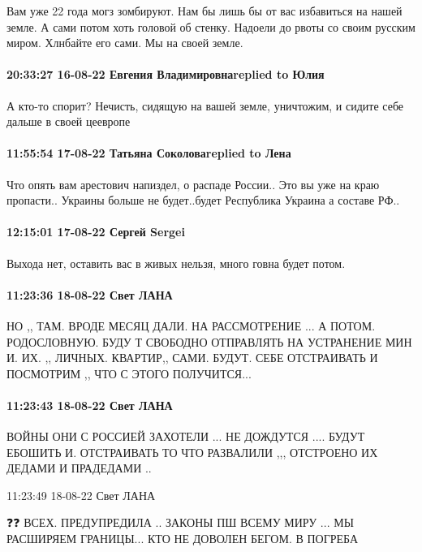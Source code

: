 Вам уже 22 года могз зомбируют. Нам бы лишь бы от вас избавиться на нашей
земле. А сами потом хоть головой об стенку. Надоели до рвоты со своим русским
миром. Хлнбайте его сами. Мы на своей земле.

\paragraph{20:33:27 16-08-22 Евгения Владимировнаreplied to Юлия}

А кто-то спорит? Нечисть, сидящую на вашей земле, уничтожим, и сидите себе дальше в своей цеевропе

\paragraph{11:55:54 17-08-22 Татьяна Соколоваreplied to Лена}

Что опять вам арестович напиздел, о распаде России.. Это вы уже на краю
пропасти.. Украины больше не будет..будет Республика Украина а составе РФ..

\paragraph{12:15:01 17-08-22 Сергей Sergei}

Выхода нет, оставить вас в живых нельзя, много говна будет потом.

\paragraph{11:23:36 18-08-22 Свет ЛАНА}

НО ,, ТАМ. ВРОДЕ МЕСЯЦ ДАЛИ. НА РАССМОТРЕНИЕ ... А ПОТОМ. РОДОСЛОВНУЮ. БУДУ Т
СВОБОДНО ОТПРАВЛЯТЬ НА УСТРАНЕНИЕ МИН И. ИХ. ,, ЛИЧНЫХ. КВАРТИР,, САМИ. БУДУТ.
СЕБЕ ОТСТРАИВАТЬ И ПОСМОТРИМ ,, ЧТО С ЭТОГО ПОЛУЧИТСЯ...

\paragraph{11:23:43 18-08-22 Свет ЛАНА}

ВОЙНЫ ОНИ С РОССИЕЙ ЗАХОТЕЛИ
... НЕ ДОЖДУТСЯ .... БУДУТ ЕБОШИТЬ И. ОТСТРАИВАТЬ ТО ЧТО РАЗВАЛИЛИ ,,,
ОТСТРОЕНО ИХ ДЕДАМИ И ПРАДЕДАМИ ..

11:23:49 18-08-22 Свет ЛАНА

❓❓ ВСЕХ. ПРЕДУПРЕДИЛА .. ЗАКОНЫ ПШ ВСЕМУ МИРУ ... МЫ РАСШИРЯЕМ ГРАНИЦЫ... КТО
НЕ ДОВОЛЕН БЕГОМ. В ПОГРЕБА

